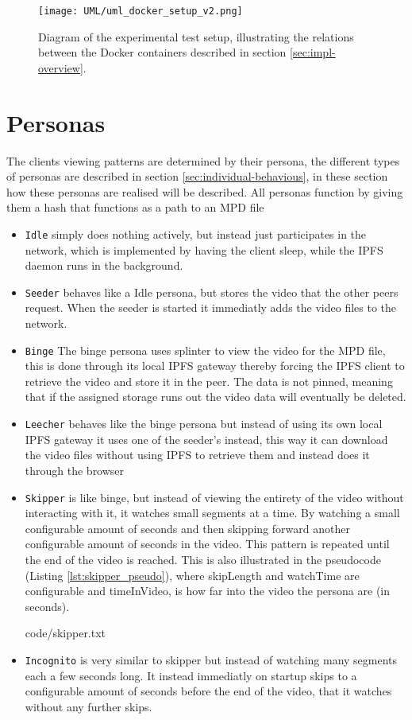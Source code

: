 \begin{figure}[bth]
    \texttt{[image: UML/uml\_docker\_setup\_v2.png]}
    \caption[Diagram of the experimental test  setup]{Diagram of the experimental test setup, illustrating the relations between the Docker containers described in section \ref{sec:impl-overview}.}
    \label{fig:uml_docker-compose}
\end{figure}

\section{Personas}
The clients viewing patterns are determined by their persona, the different types of personas are described in section \ref{sec:individual-behavious}, in these section how these personas are realised will be described.
All personas function by giving them a hash that functions as a path to an \acs{MPD} file
\begin{itemize}
    \item \texttt{Idle} simply does nothing actively, but instead just participates in the network, which is implemented by having the client sleep, while the \acs{IPFS} daemon runs in the background.
    \item \texttt{Seeder} behaves like a Idle persona, but stores the video that the other peers request. When the seeder is started it immediatly adds the video files to the network.
    \item \texttt{Binge} The binge persona uses splinter to view the video for the \acs{MPD} file, this is done through its local \acs{IPFS} gateway thereby forcing the \acs{IPFS} client to retrieve the video and store it in the peer. The data is not pinned, meaning that if the assigned storage runs out the video data will eventually be deleted.
    \item \texttt{Leecher} behaves like the binge persona but instead of using its own local \acs{IPFS} gateway it uses one of the seeder's instead, this way it can download the video files without using \acs{IPFS} to retrieve them and instead does it through the browser
    \item \texttt{Skipper} is like binge, but instead of viewing the entirety of the video without interacting with it, it watches small segments at a time. By watching a small configurable amount of seconds and then skipping forward another configurable amount of seconds  in the video. This pattern is repeated until the end of the video is reached. This is also illustrated in the pseudocode (Listing \ref{lst:skipper_pseudo}), where skipLength and watchTime are configurable and timeInVideo, is how far into the video the persona are (in seconds).
    
    {code/skipper.txt}
    \item \texttt{Incognito} is very similar to skipper but instead of watching many segments each a few seconds long. It instead immediatly on startup skips to a configurable amount of seconds before the end of the video, that it watches without any further skips.
\end{itemize}
